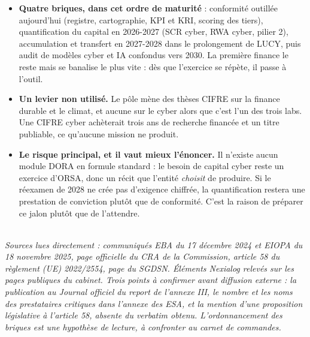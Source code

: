 \documentclass[11pt,a4paper]{article}
\begin{document}
\begin{itemize}
\item \textbf{Quatre briques, dans cet ordre de maturité} : conformité outillée aujourd'hui
      (registre, cartographie, KPI et KRI, scoring des tiers), quantification du capital en
      2026-2027 (SCR cyber, RWA cyber, pilier 2), accumulation et transfert en 2027-2028 dans le
      prolongement de LUCY, puis audit de modèles cyber et IA confondus vers 2030. La première
      finance le reste mais se banalise le plus vite : dès que l'exercice se répète, il passe à
      l'outil.
\item \textbf{Un levier non utilisé.} Le pôle mène des thèses CIFRE sur la finance durable et le
      climat, et aucune sur le cyber alors que c'est l'un des trois labs. Une CIFRE cyber
      achèterait trois ans de recherche financée et un titre publiable, ce qu'aucune mission ne
      produit.
\item \textbf{Le risque principal, et il vaut mieux l'énoncer.} Il n'existe aucun module DORA en
      formule standard : le besoin de capital cyber reste un exercice d'ORSA, donc un récit que
      l'entité \emph{choisit} de produire. Si le réexamen de 2028 ne crée pas d'exigence
      chiffrée, la quantification restera une prestation de conviction plutôt que de conformité.
      C'est la raison de préparer ce jalon plutôt que de l'attendre.
\end{itemize}

\vspace{4pt}
\noindent{\color{accent}\rule{\textwidth}{0.6pt}}\\[2pt]
{\footnotesize\itshape Sources lues directement : communiqués EBA du 17 décembre 2024 et EIOPA
du 18 novembre 2025, page officielle du CRA de la Commission, article 58 du règlement (UE)
2022/2554, page du SGDSN. Éléments Nexialog relevés sur les pages publiques du cabinet. Trois
points à confirmer avant diffusion externe : la publication au Journal officiel du report de
l'annexe III, le nombre et les noms des prestataires critiques dans l'annexe des ESA, et la
mention d'une proposition législative à l'article 58, absente du verbatim obtenu.
L'ordonnancement des briques est une hypothèse de lecture, à confronter au carnet de commandes.}
\end{document}
